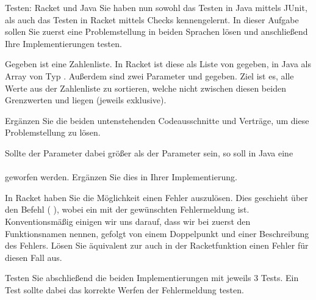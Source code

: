 \documentclass{../tuda-exercise}
\begin{document}
  \begin{task}[credit=\stars{2}{3}]{Testen: Racket und Java}
    Sie haben nun sowohl das Testen in Java mittels JUnit, als auch das Testen in Racket mittels
    Checks kennengelernt. In dieser Aufgabe sollen Sie zuerst eine Problemstellung in beiden
    Sprachen lösen und anschließend Ihre Implementierungen testen.

    \br

    Gegeben ist eine Zahlenliste. In Racket ist diese als Liste von  gegeben,
    in Java als Array von Typ . Außerdem sind zwei Parameter 
    und  gegeben. Ziel ist es, alle Werte aus der Zahlenliste zu sortieren,
    welche nicht zwischen diesen beiden Grenzwerten  und 
    liegen (jeweils exklusive).

    \br

    Ergänzen Sie die beiden untenstehenden Codeausschnitte und Verträge, um diese Problemstellung
    zu lösen.

    
    

    Sollte der Parameter  dabei größer als der Parameter 
    sein, so soll in Java eine
    \\
    \\
    geworfen werden. Ergänzen Sie dies in Ihrer Implementierung.

    \br

    In Racket haben Sie die Möglichkeit einen Fehler auszulösen. Dies geschieht über den Befehl
    ( ), wobei  ein  mit der
    gewünschten Fehlermeldung ist. Konventionsmäßig einigen wir uns darauf, dass wir bei
     zuerst den Funktionsnamen nennen, gefolgt von einem Doppelpunkt und einer
    Beschreibung des Fehlers. Lösen Sie äquivalent zur 
    auch in der Racketfunktion einen Fehler für diesen Fall aus.

    \br

    Testen Sie abschließend die beiden Implementierungen mit jeweils 3 Tests. Ein Test sollte
    dabei das korrekte Werfen der Fehlermeldung testen.

    \clearpagesolution

    \begin{solution}
      

      \clearpage

      

      \clearpage

      

      \clearpage

      
    \end{solution}
  \end{task}
\end{document}
